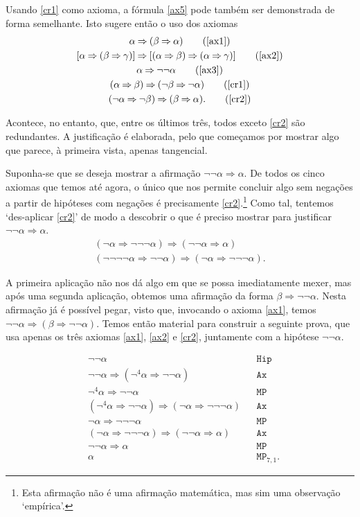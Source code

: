 \documentclass{report}
\theoremstyle{definition}
\theoremstyle{remark}
\newcommand{\imply}{\mathbin{\Rightarrow}}
\begin{document}
	Usando \eqref{cr1} como axioma, a fórmula \eqref{ax5} pode também ser demonstrada de forma semelhante. Isto sugere então o uso dos axiomas
	\begin{gather}
	\alpha \imply (\beta \imply \alpha) \tag{\ref{ax1}}\\
	[\alpha \imply (\beta \imply \gamma)] \imply [(\alpha \imply \beta) \imply (\alpha \imply \gamma)]\tag{\ref{ax2}}\\
	\alpha \imply \neg \neg \alpha \tag{\ref{ax3}}\\
	(\alpha \imply \beta) \imply (\neg \beta \imply \neg \alpha)\tag{\ref{cr1}}\\
	(\neg \alpha \imply \neg \beta) \imply (\beta \imply \alpha).\tag{\ref{cr2}}
	\end{gather}
	
	Acontece, no entanto, que, entre os últimos três, todos exceto \eqref{cr2} são redundantes. A justificação é elaborada, pelo que começamos por mostrar algo que parece, à primeira vista, apenas tangencial.
	
	Suponha-se que se deseja mostrar a afirmação $\neg \neg \alpha \imply \alpha$. De todos os cinco axiomas que temos até agora, o único que nos permite concluir algo sem negações a partir de hipóteses com negações é precisamente \eqref{cr2}.\footnote{Esta afirmação não é uma afirmação matemática, mas sim uma observação `empírica'.} Como tal, tentemos `des-aplicar \eqref{cr2}' de modo a descobrir o que é preciso mostrar para justificar $\neg\neg\alpha \imply \alpha$.
	\begin{gather*}
	(\neg\alpha \imply \neg\neg\neg\alpha) \imply (\neg\neg\alpha \imply \alpha)\\
	(\neg\neg\neg\neg\alpha \imply \neg\neg\alpha) \imply (\neg\alpha \imply \neg\neg\neg\alpha).
	\end{gather*}
	
	A primeira aplicação não nos dá algo em que se possa imediatamente mexer, mas após uma segunda aplicação, obtemos uma afirmação da forma $\beta \imply \neg\neg\alpha$. Nesta afirmação já é possível pegar, visto que, invocando o axioma \eqref{ax1}, temos $\neg\neg\alpha \imply (\beta \imply \neg\neg\alpha)$. Temos então material para construir a seguinte prova, que usa apenas os três axiomas \eqref{ax1}, \eqref{ax2} e \eqref{cr2}, juntamente com a hipótese $\neg\neg\alpha$.
	
	\begin{align*}
	&\neg\neg\alpha&&\texttt{Hip}\\
	&\neg\neg\alpha \imply (\neg^4 \alpha \imply \neg\neg\alpha)&&\texttt{Ax}\\
	&\neg^4 \alpha \imply \neg\neg\alpha&&\texttt{MP}\\
	&(\neg^4 \alpha \imply \neg\neg\alpha) \imply (\neg\alpha \imply \neg\neg\neg\alpha)&&\texttt{Ax}\\
	&\neg\alpha \imply \neg\neg\neg\alpha&&\texttt{MP}\\
	&(\neg\alpha \imply \neg\neg\neg\alpha)\imply(\neg\neg\alpha \imply \alpha)&&\texttt{Ax}\\
	&\neg\neg\alpha \imply \alpha&&\texttt{MP}\\
	&\alpha&&\texttt{MP}_{7,1}.
	\end{align*}
	
\end{document}
